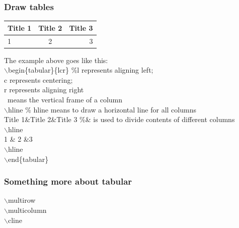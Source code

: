 \documentclass{beamer}
\begin{document}
\begin{frame}
	\frametitle{Draw tables}
    \begin{example}
        \begin{tabular}{|l|c|r|}
        \hline
        Title 1 & Title 2 & Title 3 \\
        \hline
        1 & 2 &3 \\
        \hline
        \end{tabular}
    \end{example}
    The example above goes like this:\\
        $\backslash$begin\{tabular\}\{\textvertline l\textvertline c\textvertline r\textvertline \} \%l represents aligning left; 
        \\ \qquad \qquad \qquad \qquad \qquad \quad c represents centering; 
        \\ \qquad \qquad \qquad \qquad \qquad \quad r represents aligning right
        \\ \qquad \qquad \qquad \qquad \qquad \quad \textvertline \, means the vertical frame of a column\\
        $\backslash$hline \quad \% hline means to draw a horizontal line for all columns\\
        Title 1\&Title 2\&Title 3  \%\& is used to divide contents of different columns\\
        $\backslash$hline\\
        1 \& 2 \&3 \\
        $\backslash$hline\\
        $\backslash$end\{tabular\}
\end{frame}

\begin{frame}
   \frametitle{Something more about tabular}
   $\backslash$multirow \\
   $\backslash$multicolumn \\
   $\backslash$cline{} \\
\end{frame}
\end{document}
